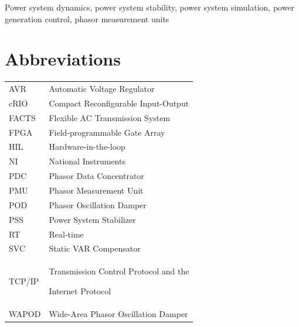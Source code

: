 \documentclass{ieeeaccess}
\begin{document}
\begin{keywords}
Power system dynamics, power system stability, power system simulation, power generation control, phasor measurement units
\end{keywords}

\titlepgskip=-15pt

\maketitle

\section*{Abbreviations}

\begin{tabular}{p{}p{}}
AVR    & Automatic Voltage Regulator                             \\
cRIO   & Compact Reconfigurable Input-Output                     \\
FACTS  & Flexible AC Transmission System                         \\
FPGA   & Field-programmable Gate Array                           \\
HIL    & Hardware-in-the-loop                                    \\
NI     & National Instruments                                    \\
PDC    & Phasor Data Concentrator                                \\
PMU    & Phasor Measurement Unit                                 \\
POD    & Phasor Oscillation Damper                               \\
PSS    & Power System Stabilizer                                 \\
RT     & Real-time                                               \\
SVC    & Static VAR Compensator                                  \\
TCP/IP & Transmission Control Protocol and the \par Internet Protocol \\
WAPOD  & Wide-Area Phasor Oscillation Damper                    

\end{tabular}
\end{document}
